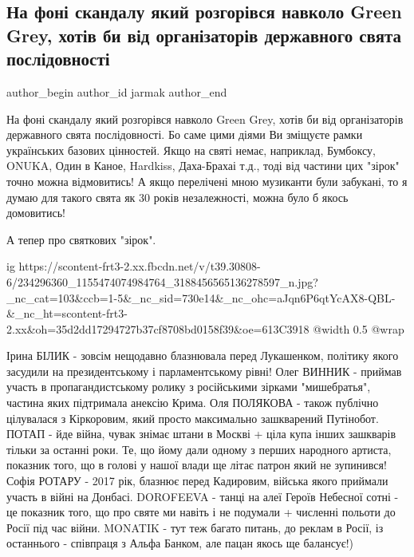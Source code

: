  
 
 
 
 
 
\subsection{На фоні скандалу який розгорівся навколо Green Grey, хотів би від організаторів державного свята послідовності}
\label{sec:09_08_2021.fb.jarmak.1.skandal_grin_grej}
 
\ifcmt
 author_begin
   author_id jarmak
 author_end
\fi


На фоні скандалу який розгорівся навколо Green Grey, хотів би від організаторів
державного свята послідовності. Бо саме цими діями Ви зміщуєте рамки
українських базових цінностей. Якщо на святі немає, наприклад, Бумбоксу, ONUKA,
Один в Каное, Hardkiss, Даха-Брахаі т.д., тоді від частини цих "зірок" точно
можна відмовитись! А якщо перелічені мною музиканти були забукані, то я думаю
для такого свята як 30 років незалежності, можна було б якось домовитись!

А тепер про святкових "зірок".

\ifcmt
  ig https://scontent-frt3-2.xx.fbcdn.net/v/t39.30808-6/234296360_1155474074984764_3188456565136278597_n.jpg?_nc_cat=103&ccb=1-5&_nc_sid=730e14&_nc_ohc=aJqn6P6qtYcAX8-QBL-&_nc_ht=scontent-frt3-2.xx&oh=35d2dd17294727b37cf8708bd0158f39&oe=613C3918
  @width 0.5
  @wrap \parpic[r]
\fi

\obeycr
Ірина БІЛИК - зовсім нещодавно блазнювала перед Лукашенком, політику якого засудили на президентському і парламентському рівні! 
Олег ВИННИК - приймав участь в пропагандистському ролику з російськими зірками "мишебратья", частина яких підтримала анексію Крима.
Оля ПОЛЯКОВА - також публічно цілувалася з Кіркоровим, який просто максимально зашкварений Путінобот. 
ПОТАП - йде війна, чувак знімає штани в Москві + ціла купа інших зашкварів тільки за останні роки. Те, що йому дали одному з перших народного артиста, показник того, що в голові у нашої влади ще літає патрон який не зупинився! 
Софія РОТАРУ - 2017 рік, блазнює перед Кадировим, війська якого приймали участь в війні на Донбасі.
DOROFEEVA - танці на алеї Героїв Небесної сотні - це показник того, що про святе ми навіть і не подумали + численні польоти до Росії під час війни.
MONATIK - тут теж багато питань, до реклам в Росії, із останнього - співпраця з Альфа Банком, але пацан якось ще балансує!)
\restorecr

